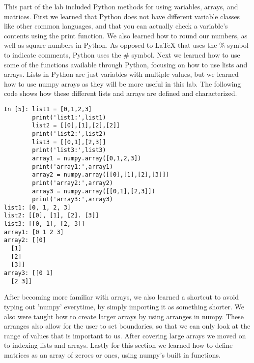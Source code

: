 This part of the lab included Python methods for using variables, arrays, and matrices. First we learned that Python does not have different variable classes like other common languages, and that you can actually check a variable's contents using the print function. We also learned how to round our numbers, as well as square numbers in Python. As opposed to LaTeX that uses the \% symbol to indicate comments, Python uses the \# symbol. Next we learned how to use some of the functions available through Python, focusing on how to use lists and arrays. Lists in Python are just variables with multiple values, but we learned how to use numpy arrays as they will be more useful in this lab. The following code shows how these different lists and arrays are defined and characterized.
\begin{lstlisting}
In [5]: list1 = [0,1,2,3]
        print('list1:',list1)
        list2 = [[0],[1],[2],[2]]
        print('list2:',list2)
        list3 = [[0,1],[2,3]]
        print('list3:',list3)
        array1 = numpy.array([0,1,2,3])
        print('array1:',array1)
        array2 = numpy.array([[0],[1],[2],[3]])
        print('array2:',array2)
        array3 = numpy.array([[0,1],[2,3]])
        print('array3:',array3)
list1: [0, 1, 2, 3]
list2: [[0], [1], [2]. [3]]
list3: [[0, 1], [2, 3]]
array1: [0 1 2 3]
array2: [[0]
  [1]
  [2]
  [3]]
array3: [[0 1]
  [2 3]]
\end{lstlisting}
After becoming more familiar with arrays, we also learned a shortcut to avoid typing out 'numpy' everytime, by simply importing it as something shorter. We also were taught how to create larger arrays by using arranges in numpy. These arranges also allow for the user to set boundaries, so that we can only look at the range of values that is important to us. After covering large arrays we moved on to indexing lists and arrays. Lastly for this section we learned how to define matrices as an array of zeroes or ones, using numpy's built in functions.